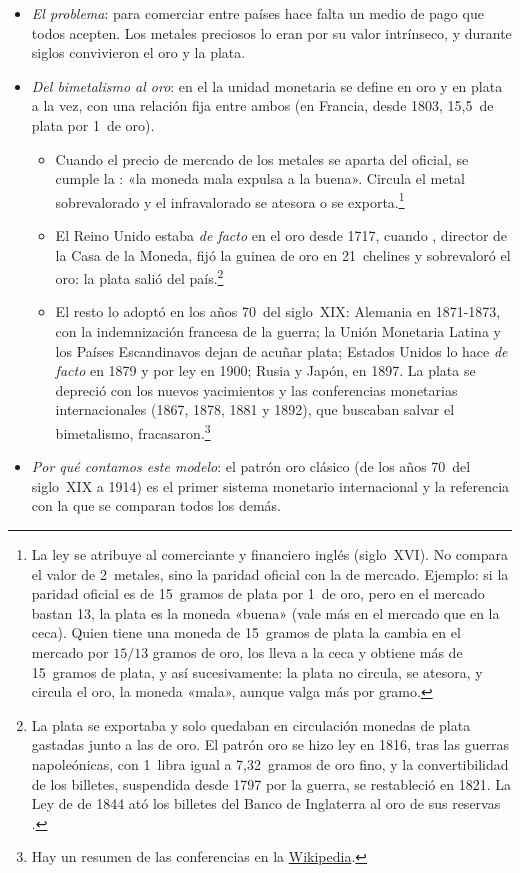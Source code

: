 \documentclass[11pt]{article}
\begin{document}
\begin{itemize}
\item \emph{El problema}: para comerciar entre países hace falta un medio de pago que todos acepten. Los metales preciosos lo eran por su valor intrínseco, y durante siglos convivieron el oro y la plata.
\item \emph{Del bimetalismo al oro}: en el  la unidad monetaria se define en oro y en plata a la vez, con una relación fija entre ambos (en Francia, desde 1803, 15,5~de plata por 1~de oro).
  \begin{itemize}
  \item Cuando el precio de mercado de los metales se aparta del oficial, se cumple la : «la moneda mala expulsa a la buena». Circula el metal sobrevalorado y el infravalorado se atesora o se exporta.\footnote{La ley se atribuye al comerciante y financiero inglés  (siglo~XVI). No compara el valor de 2~metales, sino la paridad oficial con la de mercado. Ejemplo: si la paridad oficial es de 15~gramos de plata por 1~de oro, pero en el mercado bastan 13, la plata es la moneda «buena» (vale más en el mercado que en la ceca). Quien tiene una moneda de 15~gramos de plata la cambia en el mercado por $15/13$ gramos de oro, los lleva a la ceca y obtiene más de 15~gramos de plata, y así sucesivamente: la plata no circula, se atesora, y circula el oro, la moneda «mala», aunque valga más por gramo.}
  \item El Reino Unido estaba \emph{de facto} en el oro desde 1717, cuando , director de la Casa de la Moneda, fijó la guinea de oro en 21~chelines y sobrevaloró el oro: la plata salió del país.\footnote{La plata se exportaba y solo quedaban en circulación monedas de plata gastadas junto a las de oro. El patrón oro se hizo ley en 1816, tras las guerras napoleónicas, con 1~libra igual a 7,32~gramos de oro fino, y la convertibilidad de los billetes, suspendida desde 1797 por la guerra, se restableció en 1821. La Ley de  de 1844 ató los billetes del Banco de Inglaterra al oro de sus reservas  .}
  \item El resto lo adoptó en los años 70~del siglo~XIX: Alemania en 1871-1873, con la indemnización francesa de la guerra; la Unión Monetaria Latina y los Países Escandinavos dejan de acuñar plata; Estados Unidos lo hace \emph{de facto} en 1879 y por ley en 1900; Rusia y Japón, en 1897. La plata se depreció con los nuevos yacimientos y las conferencias monetarias internacionales (1867, 1878, 1881 y 1892), que buscaban salvar el bimetalismo, fracasaron.\footnote{Hay un resumen de las conferencias en la \href{https://es.wikipedia.org/wiki/Conferencias_monetarias_internacionales}{Wikipedia}.}
  \end{itemize}
\item \emph{Por qué contamos este modelo}: el patrón oro clásico (de los años 70~del siglo~XIX a 1914) es el primer sistema monetario internacional y la referencia con la que se comparan todos los demás.
\end{itemize}
\end{document}
